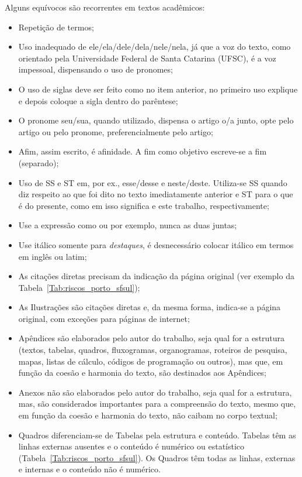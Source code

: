 \documentclass[
	12pt,				%
	oneside,			%
	a4paper,			%
	chapter=TITLE,		%
	section=TITLE,		%
	english,			%
	brazil,				%
	]{abntex2}
\begin{document}
Alguns equívocos são recorrentes em textos acadêmicos:
%
\begin{itemize}
    \item Repetição de termos;
    \item Uso inadequado de ele/ela/dele/dela/nele/nela, já que a voz do texto, como orientado pela Universidade Federal de Santa Catarina (UFSC), é a voz impessoal, dispensando o uso de pronomes;
    \item O uso de siglas deve ser feito como no item anterior, no primeiro uso explique e depois coloque a sigla dentro do parêntese;
    \item O pronome seu/sua, quando utilizado, dispensa o artigo o/a junto, opte pelo artigo ou pelo pronome, preferencialmente pelo artigo;
    \item Afim, assim escrito, é afinidade. A fim como objetivo escreve-se a fim (separado);
    \item Uso de SS e ST em, por ex., esse/desse e neste/deste. Utiliza-se SS quando diz respeito ao que foi dito no texto imediatamente anterior e ST para o que é do presente, como em isso significa e este trabalho, respectivamente;
    \item Use a expressão como ou por exemplo, nunca as duas juntas;
    \item Use itálico somente para \emph{destaques}, é desnecessário colocar itálico em termos em inglês ou latim;
    \item As citações diretas precisam da indicação da página original (ver exemplo da Tabela~\ref{Tab:riscos_porto_sfsul});
    \item As Ilustrações são citações diretas e, da mesma forma, indica-se a página original, com exceções para páginas de internet;
    \item Apêndices são elaborados pelo autor do trabalho, seja qual for a estrutura (textos, tabelas, quadros, fluxogramas, organogramas, roteiros de pesquisa, mapas, listas de cálculo, códigos de programação ou outros), mas que, em função da coesão e harmonia do texto, são destinados aos Apêndices;
    \item Anexos não são elaborados pelo autor do trabalho, seja qual for a estrutura, mas, são considerados importantes para a compreensão do texto, mesmo que, em função da coesão e harmonia do texto, não caibam no corpo textual;
    \item Quadros diferenciam-se de Tabelas pela estrutura e conteúdo. Tabelas têm as linhas externas ausentes e o conteúdo é numérico ou estatístico (Tabela~\ref{Tab:riscos_porto_sfsul}).
          Os Quadros têm todas as linhas, externas e internas e o conteúdo não é numérico.
\end{itemize}
\end{document}
